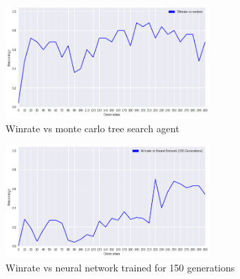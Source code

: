 \begin{figure}
    \begin{small}
        \begin{center}
            \includegraphics[width=0.7\textwidth]{graphics/winratevsmcts.png}
        \end{center}
        \caption{Winrate vs monte carlo tree search agent}
        \label{fig:winratevsmcts}
    \end{small}
\end{figure}

\begin{figure}
    \begin{small}
        \begin{center}
            \includegraphics[width=0.7\textwidth]{graphics/winratevsneuralnetwork.png}
        \end{center}
        \caption{Winrate vs neural network trained for 150 generations}
        \label{fig:winratevsneuralnetwork}
    \end{small}
\end{figure}

